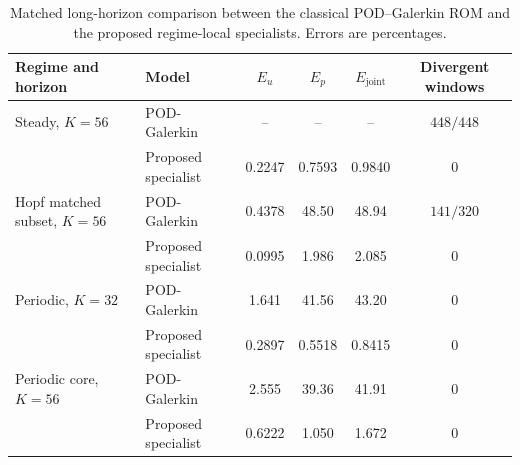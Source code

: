 \begin{table}[htbp]
\centering
\caption{Matched long-horizon comparison between the classical
POD--Galerkin ROM and the proposed regime-local
specialists. Errors are percentages.}
\label{tab:pinball_galerkin_matched}

\small
\renewcommand{\arraystretch}{1.10}
\setlength{\tabcolsep}{5pt}

\begin{tabular}{@{}llcccc@{}}
\toprule
Regime and horizon
& Model
& $E_u$
& $E_p$
& $E_{\mathrm{joint}}$
& Divergent windows \\
\midrule

Steady, $K=56$
& POD-Galerkin
& --
& --
& --
& $448/448$ \\

& Proposed specialist
& 0.2247
& 0.7593
& 0.9840
& 0 \\

\midrule

Hopf matched subset, $K=56$
& POD-Galerkin
& 0.4378
& 48.50
& 48.94
& $141/320$ \\

& Proposed specialist
& 0.0995
& 1.986
& 2.085
& 0 \\

\midrule

Periodic, $K=32$
& POD-Galerkin
& 1.641
& 41.56
& 43.20
& 0 \\

& Proposed specialist
& 0.2897
& 0.5518
& 0.8415
& 0 \\

\midrule

Periodic core, $K=56$
& POD-Galerkin
& 2.555
& 39.36
& 41.91
& 0 \\

& Proposed specialist
& 0.6222
& 1.050
& 1.672
& 0 \\

\bottomrule
\end{tabular}
\end{table}

